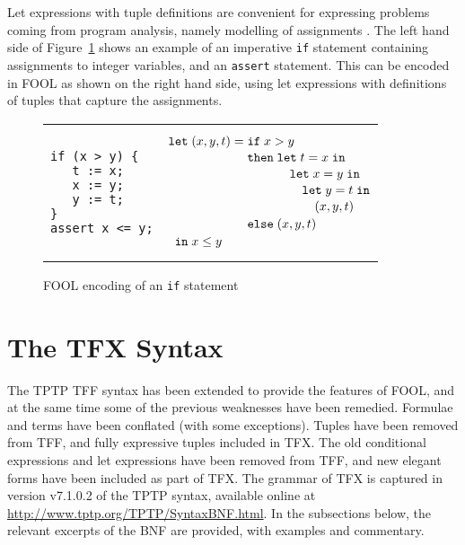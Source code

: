 \documentclass{easychair}
\begin{document}
Let expressions with tuple definitions are convenient for expressing 
problems coming from program analysis, namely modelling of assignments
\cite{KKV18}.
The left hand side of Figure~\ref{fig:simple-if} shows an example of an 
imperative \texttt{if} statement containing assignments to integer variables, 
and an \texttt{assert} statement. 
This can be encoded in FOOL as shown on the right hand side, using 
let expressions with definitions of tuples that capture the assignments.

\begin{figure}[htbp]
\begin{center}
\begin{tabular}[t]{ll}
\begin{minipage}{0.3\textwidth}
\begin{verbatim}
if (x > y) {
   t := x;
   x := y;
   y := t;
}
assert x <= y;
\end{verbatim}
\end{minipage}
&
\begin{minipage}{0.3\textwidth}
\[
  \letnl{(x,y,t)}{\itenll{x > y}
                 {\letinnl{t}{x}
                          {\letinnl{x}{y}
                                   {\letinnl{y}{t}
                                            {(x,y,t)}}}}
                 {(x,y,t)}}
        {x \le y}
\]
\end{minipage}
\\
\end{tabular}
\end{center}
\caption{FOOL encoding of an {\tt if} statement}
\label{fig:simple-if}
\end{figure}

\section{The TFX Syntax}
\label{TFX}

The TPTP TFF syntax has been extended to provide the features of FOOL,
and at the same time some of the previous weaknesses have been remedied.
Formulae and terms have been conflated (with some exceptions).
Tuples have been removed from TFF, and fully expressive tuples included in 
TFX. 
The old conditional expressions and let expressions have been removed from 
TFF, and new elegant forms have been included as part of TFX. 
The grammar of TFX is captured in version v7.1.0.2 of the TPTP syntax,
available online at \url{http://www.tptp.org/TPTP/SyntaxBNF.html}.
In the subsections below, the relevant excerpts of the BNF are provided,
with examples and commentary.
\end{document}
